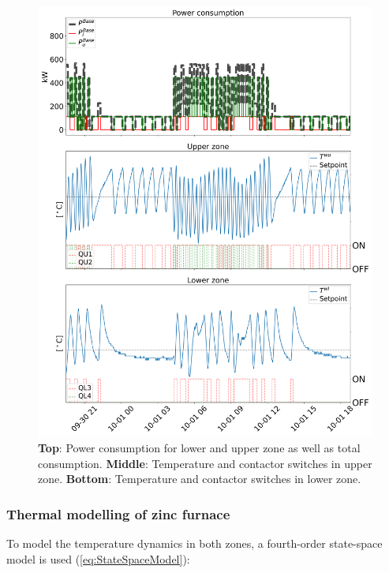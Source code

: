 \documentclass[sigconf]{acmart}
\begin{document}
\begin{figure}[t]
    \centering
    \includegraphics[width=\columnwidth]{figures/data_visualization.png}
    \caption{\textbf{Top}: Power consumption for lower and upper zone as well as total consumption. \textbf{Middle}: Temperature and contactor switches in upper zone. \textbf{Bottom}: Temperature and contactor switches in lower zone.}
    \label{fig:data_visualization}
\end{figure}

\subsubsection{Thermal modelling of zinc furnace}

To model the temperature dynamics in both zones, a fourth-order state-space model is used (\ref{eq:StateSpaceModel}):
\end{document}
